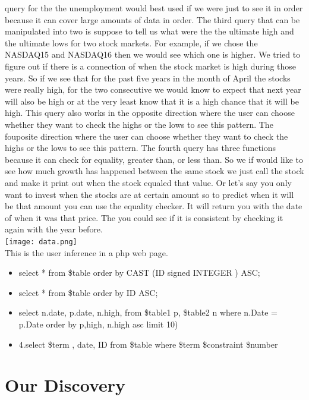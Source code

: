 \documentclass[12pt]{report}
\begin{document}
query for the the unemployment would best used if we were just to see it in order because it can cover large amounts of data in order. The third query that can be manipulated into two is suppose to tell us what were the the ultimate high and the ultimate lows for two stock markets. For example, if we chose the NASDAQ15 and NASDAQ16 then we would see which one is higher. We tried to figure out if there is a connection of when the stock market is high during those years. So if we see that for the past five years in the month of April the stocks were really high, for the two consecutive we would know to expect that next year will also be high or at the very least know that it is a high chance that it will be high. This query also works in the opposite direction where the user can choose whether they want to check the highs or the lows to see this pattern. The fouposite direction where the user can choose whether they want to check the highs or the lows to see this pattern. The fourth query has three functions because it can check for equality, greater than, or less than. So we if would like to see how much growth has happened between the same stock we just call the stock and make it print out when the stock equaled that value. Or let's say you only want to invest when the stocks are at certain amount so to predict when it will be that amount you can use the equality checker. It will return you with the date of when it was that price. The you could see if it is consistent by checking it again with the year before.\\


\texttt{[image: data.png]}
\\This is the user inference in a php web page.\\
\begin{itemize}
\item select * from \$table order by CAST (ID signed INTEGER ) ASC;
\item select * from \$table order by ID ASC;
\item select n.date, p.date, n.high, from \$table1 p, \$table2 n where n.Date = p.Date order by p,high, n.high asc limit 10)
\item 4.select \$term , date, ID from \$table where \$term \$constraint \$number
\end{itemize}

\section{Our Discovery}
\end{document}
